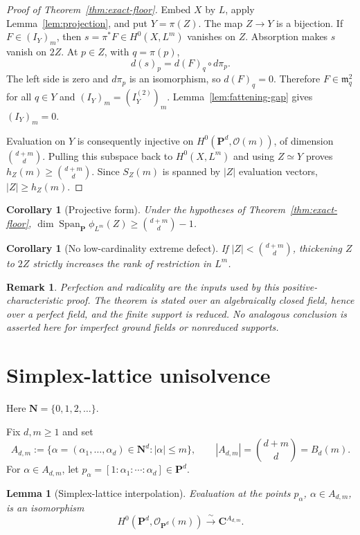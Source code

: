 \documentclass[11pt]{article}
\newtheorem{lemma}[theorem]{Lemma}
\newtheorem{corollary}[theorem]{Corollary}
\newtheorem{remark}[theorem]{Remark}
\newcommand{\PP}{\mathbf P}
\newcommand{\CC}{\mathbf C}
\newcommand{\NN}{\mathbf N}
\newcommand{\cO}{\mathcal O}
\newcommand{\Span}{\operatorname{Span}}
\newcommand{\BZ}{B_d(m)}
\begin{document}
\begin{proof}[Proof of Theorem~\ref{thm:exact-floor}]
Embed $X$ by $L$, apply Lemma~\ref{lem:projection}, and put $Y=\pi(Z)$.
The map $Z\to Y$ is a bijection.  If $F\in(I_Y)_m$, then
$s=\pi^*F\in H^0(X,L^m)$ vanishes on $Z$.  Absorption makes $s$ vanish on
$2Z$.  At $p\in Z$, with $q=\pi(p)$,
\[
 d(s)_p=d(F)_q\circ d\pi_p.
\]
The left side is zero and $d\pi_p$ is an isomorphism, so $d(F)_q=0$.
Therefore $F\in\mathfrak m_q^2$ for all $q\in Y$ and
$(I_Y)_m=(I_Y^{(2)})_m$.  Lemma~\ref{lem:fattening-gap} gives
$(I_Y)_m=0$.

Evaluation on $Y$ is consequently injective on
$H^0(\PP^d,\cO(m))$, of dimension $\binom{d+m}{d}$.  Pulling this subspace
back to $H^0(X,L^m)$ and using $Z\simeq Y$ proves
$h_Z(m)\geq\binom{d+m}{d}$.  Since $S_Z(m)$ is spanned by $|Z|$ evaluation
vectors, $|Z|\geq h_Z(m)$.
\end{proof}

\begin{corollary}[Projective form]
Under the hypotheses of Theorem~\ref{thm:exact-floor},
$\dim\Span_{\PP}\phi_{L^m}(Z)\geq\binom{d+m}{d}-1$.
\end{corollary}

\begin{corollary}[No low-cardinality extreme defect]
If $|Z|<\binom{d+m}{d}$, thickening $Z$ to $2Z$ strictly increases the rank
of restriction in $L^m$.
\end{corollary}

\begin{remark}
Perfection and radicality are the inputs used by this positive-characteristic
proof.  The theorem is stated over an algebraically closed field, hence over a
perfect field, and the finite support is reduced.  No analogous conclusion is
asserted here for imperfect ground fields or nonreduced supports.
\end{remark}

\section{Simplex-lattice unisolvence}\label{sec:unisolvence}

Here $\NN=\{0,1,2,\ldots\}$.

Fix $d,m\geq1$ and set
\[
 A_{d,m}:=\{\alpha=(\alpha_1,\ldots,\alpha_d)\in\NN^d:|\alpha|\leq m\},
 \qquad |A_{d,m}|=\binom{d+m}{d}=\BZ.
\]
For $\alpha\in A_{d,m}$, let
$p_\alpha=[1:\alpha_1:\cdots:\alpha_d]\in\PP^d$.

\begin{lemma}[Simplex-lattice interpolation]\label{lem:unisolvent}
Evaluation at the points $p_\alpha$, $\alpha\in A_{d,m}$, is an isomorphism
\[
 H^0(\PP^d,\cO_{\PP^d}(m))\xrightarrow{\ \sim\ }\CC^{A_{d,m}}.
\]
\end{lemma}
\end{document}
